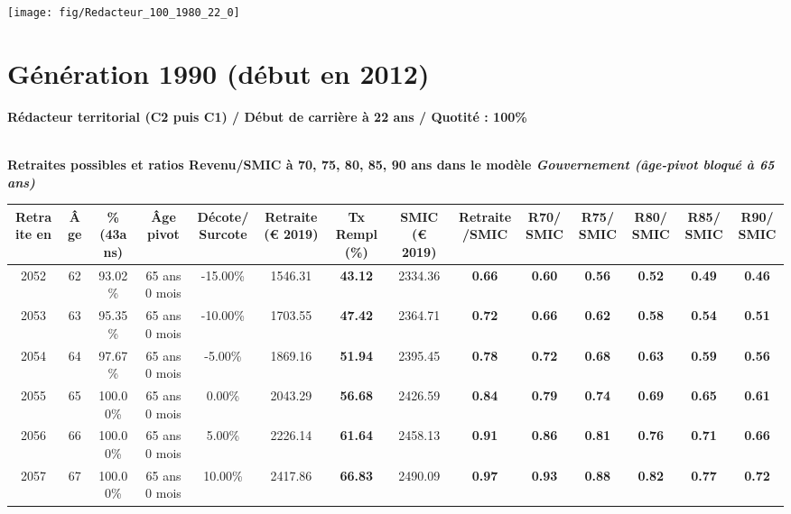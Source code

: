  {\hspace{-2.2cm}\texttt{[image: fig/Redacteur\_100\_1980\_22\_0]}} 

\newpage 
 
\section{Génération 1990 (début en 2012)\label{Redacteur_100_1990_22_0}} 
 
{\bf \noindent Rédacteur territorial (C2 puis C1) / Début de carrière à 22 ans / Quotité : 100\%}  ~ 

 ~\\{\bf \noindent Retraites possibles et ratios Revenu/SMIC à 70, 75, 80, 85, 90 ans dans le modèle \emph{Gouvernement (âge-pivot bloqué à 65 ans)}}  
 
\begin{adjustbox}{max width=\textwidth} 
\begin{tabular}[htb]{|c|c||c|c|c||c|c||c|c||c|c|c|c|c|} 
\hline 
 Retraite en &  Âge &  \%(43ans) &  Âge pivot &  Décote/Surcote &  Retraite (\euro{} 2019) &  Tx Rempl(\%) &  SMIC (\euro{} 2019) &  Retraite/SMIC &  R70/SMIC &  R75/SMIC &  R80/SMIC &  R85/SMIC &  R90/SMIC \\ 
\hline \hline 
 2052 &  62 &  93.02\% &  65 ans 0 mois &  -15.00\% &  1546.31 &  {\bf 43.12} &  2334.36 &  {\bf {\color{red} 0.66}} &  {\bf {\color{red} 0.60}} &  {\bf {\color{red} 0.56}} &  {\bf {\color{red} 0.52}} &  {\bf {\color{red} 0.49}} &  {\bf {\color{red} 0.46}} \\ 
\hline 
 2053 &  63 &  95.35\% &  65 ans 0 mois &  -10.00\% &  1703.55 &  {\bf 47.42} &  2364.71 &  {\bf {\color{red} 0.72}} &  {\bf {\color{red} 0.66}} &  {\bf {\color{red} 0.62}} &  {\bf {\color{red} 0.58}} &  {\bf {\color{red} 0.54}} &  {\bf {\color{red} 0.51}} \\ 
\hline 
 2054 &  64 &  97.67\% &  65 ans 0 mois &  -5.00\% &  1869.16 &  {\bf 51.94} &  2395.45 &  {\bf {\color{red} 0.78}} &  {\bf {\color{red} 0.72}} &  {\bf {\color{red} 0.68}} &  {\bf {\color{red} 0.63}} &  {\bf {\color{red} 0.59}} &  {\bf {\color{red} 0.56}} \\ 
\hline 
 2055 &  65 &  100.00\% &  65 ans 0 mois &  0.00\% &  2043.29 &  {\bf 56.68} &  2426.59 &  {\bf {\color{red} 0.84}} &  {\bf {\color{red} 0.79}} &  {\bf {\color{red} 0.74}} &  {\bf {\color{red} 0.69}} &  {\bf {\color{red} 0.65}} &  {\bf {\color{red} 0.61}} \\ 
\hline 
 2056 &  66 &  100.00\% &  65 ans 0 mois &  5.00\% &  2226.14 &  {\bf 61.64} &  2458.13 &  {\bf {\color{red} 0.91}} &  {\bf {\color{red} 0.86}} &  {\bf {\color{red} 0.81}} &  {\bf {\color{red} 0.76}} &  {\bf {\color{red} 0.71}} &  {\bf {\color{red} 0.66}} \\ 
\hline 
 2057 &  67 &  100.00\% &  65 ans 0 mois &  10.00\% &  2417.86 &  {\bf 66.83} &  2490.09 &  {\bf {\color{red} 0.97}} &  {\bf {\color{red} 0.93}} &  {\bf {\color{red} 0.88}} &  {\bf {\color{red} 0.82}} &  {\bf {\color{red} 0.77}} &  {\bf {\color{red} 0.72}} \\ 
\hline 
\hline 
\end{tabular} 
\end{adjustbox} 
 
